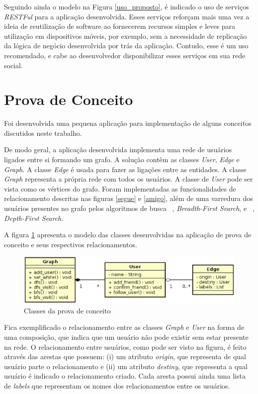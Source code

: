 Seguindo ainda o modelo na Figura \ref{uso_proposto}, é indicado o uso de serviços \textit{RESTFul} para a aplicação desenvolvida. Esses serviços reforçam mais uma vez a ideia de reutilização de software ao fornecerem recursos simples e leves para utilização em dispositivos móveis, por exemplo, sem a necessidade de replicação da lógica de negócio desenvolvida por trás da aplicação. Contudo, esse é um uso recomendado, e cabe ao desenvolvedor disponibilizar esses serviços em sua rede social.

\section{Prova de Conceito}

Foi desenvolvida uma pequena aplicação para implementação de alguns conceitos discutidos neste trabalho.

De modo geral, a aplicação desenvolvida implementa uma rede de usuários ligados entre si formando um grafo. A solução contêm as classes \textit{User}, \textit{Edge} e \textit{Graph}. A classe \textit{Edge} é usada para fazer as ligações entre as entidades. A classe \textit{Graph} representa a própria rede com todos os usuários. A classe de \textit{User} pode ser vista como os vértices do grafo. Foram implementadas as funcionalidades de relacionamento descritas nas figuras \ref{segue} e \ref{amigo}, além de uma varredura dos usuários presentes no grafo pelos algoritmos de busca ~, \textit{Breadth-First Search}, e ~, \textit{Depth-First Search}.

A figura \ref{modelo prova de conceito} apresenta o modelo das classes desenvolvidas na aplicação de prova de conceito e seus respectivos relacionamentos.

\begin{figure}[!h]
	\centering
	\includegraphics[scale=0.8]{figuras/capitulo5/classes_prova_conceito.eps}
	\caption{Classes da prova de conceito}
	\label{modelo prova de conceito}
\end{figure}

Fica exemplificado o relacionamento entre as classes \textit{Graph} e \textit{User} na forma de uma composição, que indica que um usuário não pode existir sem estar presente na rede. O relacionamento entre usuários, como pode ser visto na figura, é feito através das arestas que possuem: (i) um atributo \textit{origin}, que representa de qual usuário parte o relacionamento e (ii) um atributo \textit{destiny}, que representa a qual usuário é indicado o relacionamento criado. Cada aresta possui ainda uma lista de \textit{labels} que representam os nomes dos relacionamentos entre os usuários.

